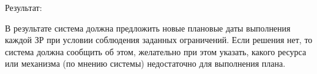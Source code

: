 	Результат:
	
	В результате система должна предложить новые плановые даты выполнения каждой ЗР при условии соблюдения заданных ограничений. Если решения нет, то система должна сообщить об этом, желательно при этом указать, какого ресурса или механизма (по мнению системы) недостаточно для выполнения плана.
	






\clearpage
